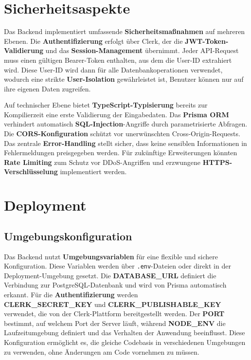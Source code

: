 \section{Sicherheitsaspekte}

Das Backend implementiert umfassende \textbf{Sicherheitsmaßnahmen} auf mehreren Ebenen. Die \textbf{Authentifizierung} erfolgt über Clerk, der die \textbf{JWT-Token-Validierung} und das \textbf{Session-Management} übernimmt. Jeder API-Request muss einen gültigen Bearer-Token enthalten, aus dem die User-ID extrahiert wird. Diese User-ID wird dann für alle Datenbankoperationen verwendet, wodurch eine strikte \textbf{User-Isolation} gewährleistet ist, Benutzer können nur auf ihre eigenen Daten zugreifen.

Auf technischer Ebene bietet \textbf{TypeScript-Typisierung} bereits zur Kompilierzeit eine erste Validierung der Eingabedaten. Das \textbf{Prisma ORM} verhindert automatisch \textbf{SQL-Injection}-Angriffe durch parametrisierte Abfragen. Die \textbf{CORS-Konfiguration} schützt vor unerwünschten Cross-Origin-Requests. Das zentrale \textbf{Error-Handling} stellt sicher, dass keine sensiblen Informationen in Fehlermeldungen preisgegeben werden. Für zukünftige Erweiterungen könnten \textbf{Rate Limiting} zum Schutz vor DDoS-Angriffen und erzwungene \textbf{HTTPS-Verschlüsselung} implementiert werden.

\section{Deployment}

\subsection{Umgebungskonfiguration}

Das Backend nutzt \textbf{Umgebungsvariablen} für eine flexible und sichere Konfiguration. Diese Variablen werden über \texttt{.env}-Dateien oder direkt in der Deployment-Umgebung gesetzt. Die \textbf{DATABASE\_URL} definiert die Verbindung zur PostgreSQL-Datenbank und wird von Prisma automatisch erkannt. Für die \textbf{Authentifizierung} werden\\ \textbf{CLERK\_SECRET\_KEY} und \textbf{CLERK\_PUBLISHABLE\_KEY} verwendet, die von der Clerk-Plattform bereitgestellt werden. Der \textbf{PORT} bestimmt, auf welchem Port der Server läuft, während \textbf{NODE\_ENV} die Laufzeitumgebung definiert und das Verhalten der Anwendung beeinflusst. Diese Konfiguration ermöglicht es, die gleiche Codebasis in verschiedenen Umgebungen zu verwenden, ohne Änderungen am Code vornehmen zu müssen.

